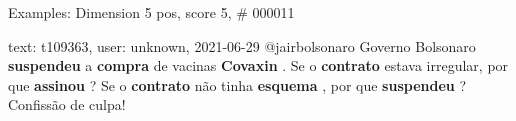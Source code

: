 \begin{frame}{Examples: Dimension 5 pos, score 5, \# 000011}
\footnotesize
\begin{exampleblock}{text: t109363, user: unknown, 2021-06-29}
@jairbolsonaro Governo Bolsonaro \textbf{suspendeu} a \textbf{compra} de 
vacinas \textbf{Covaxin} . Se o \textbf{contrato} estava irregular, por que 
\textbf{assinou} ? Se o \textbf{contrato} não tinha \textbf{esquema} , por que 
\textbf{suspendeu} ? Confissão de culpa! 
\end{exampleblock}
\end{frame}
